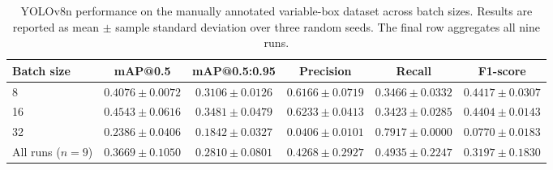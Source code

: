 \begin{table}[htbp]
    \centering
    \caption{YOLOv8n performance on the manually annotated variable-box dataset across batch sizes. Results are reported as mean $\pm$ sample standard deviation over three random seeds. The final row aggregates all nine runs.}
    \label{tab:yolov8n_variable_boxes_batch_size}
    \begin{tabular}{lccccc}
        \toprule
        Batch size & mAP@0.5 & mAP@0.5:0.95 & Precision & Recall & F1-score \\
        \midrule
        8  & $0.4076 \pm 0.0072$ & $0.3106 \pm 0.0126$ & $0.6166 \pm 0.0719$ & $0.3466 \pm 0.0332$ & $\mathbf{0.4417 \pm 0.0307}$ \\
        16 & $\mathbf{0.4543 \pm 0.0616}$ & $\mathbf{0.3481 \pm 0.0479}$ & $0.6233 \pm 0.0413$ & $0.3423 \pm 0.0285$ & $0.4404 \pm 0.0143$ \\
        32 & $0.2386 \pm 0.0406$ & $0.1842 \pm 0.0327$ & $0.0406 \pm 0.0101$ & $\mathbf{0.7917 \pm 0.0000}$ & $0.0770 \pm 0.0183$ \\
        \midrule
        All runs ($n=9$) & $0.3669 \pm 0.1050$ & $0.2810 \pm 0.0801$ & $0.4268 \pm 0.2927$ & $0.4935 \pm 0.2247$ & $0.3197 \pm 0.1830$ \\
        \bottomrule
    \end{tabular}
\end{table}

